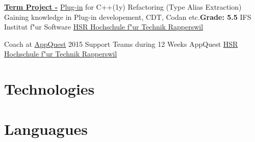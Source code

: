 \documentclass[11pt,legalpaper,sans]{moderncv}
\begin{document}
{\href{https://eprints.hsr.ch/479/1/aliextor.pdf}{\textbf{Term Project -}} \href{https://www.youtube.com/watch?v=QNrb_LbuYmI}{Plug-in} for C++(1y) Refactoring (Type Alias Extraction)}{}
{\newline{}Gaining knowledge in Plug-in developement, CDT, Codan etc.}{\hfill \textbf{Grade: 5.5}}
{IFS Institut f"ur Software \hfill\href{http://www.hsr.ch/}{HSR Hochschule f"ur Technik Rapperswil}}

{Coach at \href{http://appquest.hsr.ch/}{AppQuest} 2015}{}
{\newline{}Support Teams during 12 Weeks}{}
{AppQuest \hfill\href{http://www.hsr.ch/}{HSR Hochschule f"ur Technik Rapperswil}}

\section{Technologies}
{}{}{}{}

\section{Languagues}
{}{}{}{}
{}{}{}{}
\end{document}
